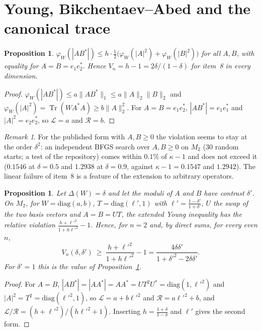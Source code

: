 \documentclass[11pt]{article}
\DeclareMathOperator{\Tr}{Tr}
\newcommand{\cL}{\mathcal{L}}
\newcommand{\cR}{\mathcal{R}}
\theoremstyle{plain}
\newtheorem{proposition}[theorem]{Proposition}
\theoremstyle{definition}
\theoremstyle{remark}
\newtheorem{remark}[theorem]{Remark}
\begin{document}
\section{Young, Bikchentaev--Abed and the canonical trace}\label{sec:linear}

\begin{proposition}\label{prop:young}
$\varphi_W(|AB^*|)\le h\cdot\frac12\bigl(\varphi_W(|A|^2)+\varphi_W(|B|^2)\bigr)$ for all $A,B$, with equality for
$A=B=e_1e_2^*$. Hence $V_n=h-1=2\delta/(1-\delta)$ for item~8 in every dimension.
\end{proposition}
\begin{proof}
$\varphi_W(|AB^*|)\le a\|AB^*\|_1\le a\|A\|_2\|B\|_2$ and $\varphi_W(|A|^2)=\Tr(WA^*A)\ge b\|A\|_2^2$. For $A=B=e_1e_2^*$,
$|AB^*|=e_1e_1^*$ and $|A|^2=e_2e_2^*$, so $\cL=a$ and $\cR=b$.
\end{proof}

\begin{remark}
For the published form with $A,B\ge0$ the violation seems to stay at the order $\delta^2$: an independent BFGS search
over $A,B\ge0$ on $M_2$ (30 random starts; a test of the repository) comes within $0.1\%$ of $\kappa-1$ and does not
exceed it ($0.1546$ at $\delta=0.5$ and $1.2938$ at $\delta=0.9$, against $\kappa-1=0.1547$ and $1.2942$). The linear
failure of item~8 is a feature of the extension to arbitrary operators.
\end{remark}

\begin{proposition}\label{prop:youngtwo}
Let $\Delta(W)=\delta$ and let the moduli of $A$ and $B$ have contrast $\delta'$. On $M_2$, for $W=\mathrm{diag}(a,b)$,
$T=\mathrm{diag}(\ell',1)$ with $\ell'=\frac{1-\delta'}{1+\delta'}$, $U$ the swap of the two basis vectors and $A=B=UT$,
the extended Young inequality has the relative violation $\frac{h+\ell'^2}{1+h\ell'^2}-1$. Hence, for $n=2$ and, by direct
sums, for every even $n$,
\[
  V_n(\delta,\delta')\ \ge\ \frac{h+\ell'^2}{1+h\ell'^2}-1=\frac{4\delta\delta'}{1+\delta'^2-2\delta\delta'}.
\]
For $\delta'=1$ this is the value of Proposition~\ref{prop:young}.
\end{proposition}
\begin{proof}
For $A=B$, $|AB^*|=|AA^*|=AA^*=UT^2U^*=\mathrm{diag}(1,\ell'^2)$ and $|A|^2=T^2=\mathrm{diag}(\ell'^2,1)$, so $\cL=a+b\ell'^2$ and
$\cR=a\ell'^2+b$, and $\cL/\cR=(h+\ell'^2)/(h\ell'^2+1)$. Inserting $h=\frac{1+\delta}{1-\delta}$ and $\ell'$ gives the second form.
\end{proof}
\end{document}
